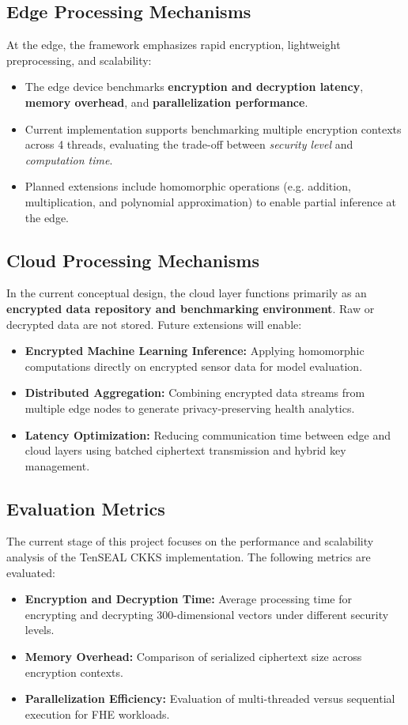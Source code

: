 \documentclass[review]{elsarticle}
\begin{document}
\subsection{Edge Processing Mechanisms}
At the edge, the framework emphasizes rapid encryption, lightweight preprocessing, and scalability:
\begin{itemize}
    \item The edge device benchmarks \textbf{encryption and decryption latency}, \textbf{memory overhead}, and \textbf{parallelization performance}.
    \item Current implementation supports benchmarking multiple encryption contexts across 4 threads, evaluating the trade-off between \textit{security level} and \textit{computation time}.
    \item Planned extensions include homomorphic operations (e.g. addition, multiplication, and polynomial approximation) to enable partial inference at the edge.
\end{itemize}

\subsection{Cloud Processing Mechanisms}
In the current conceptual design, the cloud layer functions primarily as an \textbf{encrypted data repository and benchmarking environment}. Raw or decrypted data are not stored. Future extensions will enable:
\begin{itemize}
    \item \textbf{Encrypted Machine Learning Inference:} Applying homomorphic computations directly on encrypted sensor data for model evaluation.
    \item \textbf{Distributed Aggregation:} Combining encrypted data streams from multiple edge nodes to generate privacy-preserving health analytics.
    \item \textbf{Latency Optimization:} Reducing communication time between edge and cloud layers using batched ciphertext transmission and hybrid key management.
\end{itemize}

\subsection{Evaluation Metrics}
The current stage of this project focuses on the performance and scalability analysis of the TenSEAL CKKS implementation. The following metrics are evaluated:
\begin{itemize}
    \item \textbf{Encryption and Decryption Time:} Average processing time for encrypting and decrypting 300-dimensional vectors under different security levels.
    \item \textbf{Memory Overhead:} Comparison of serialized ciphertext size across encryption contexts.
    \item \textbf{Parallelization Efficiency:} Evaluation of multi-threaded versus sequential execution for FHE workloads.
\end{itemize}
\end{document}
